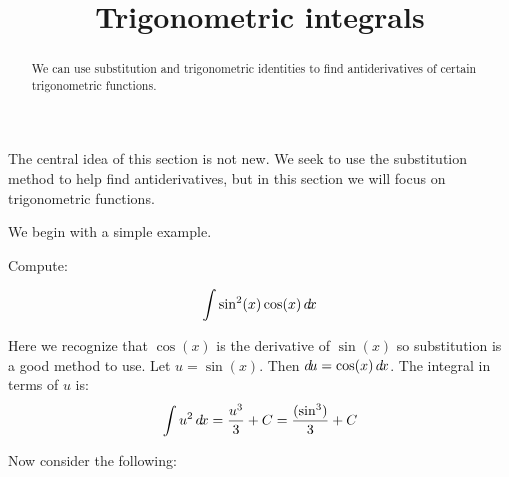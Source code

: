 \documentclass{ximera}
\title[Dig-In:]{Trigonometric integrals}
\begin{document}
\begin{abstract}
  We can use substitution and trigonometric identities to find antiderivatives of certain
  trigonometric functions.
\end{abstract}
\maketitle

The central idea of this section is not new. We seek to use the substitution method to help find antiderivatives, but in this section we will focus on trigonometric functions. 

We begin with a simple example.

\begin{example}
Compute:

\[
\int \sin^{2}(x) \cos(x) \mathop{}\!d\! x
\]

\begin{explanation}
Here we recognize that $\cos(x)$ is the derivative of $\sin(x)$ so substitution is a good method to use. Let $u=\sin(x)$. Then $\mathop{}\!d\! u=\cos(x) \mathop{}\!d\! x$. 
The integral in terms of $u$ is:
\[ 
\int u^{2} \mathop{}\!d\! x=\frac{u^{3}}{3}+C=\frac{ (\sin^{3})}{3}+C
\]
\end{explanation}

\end{example}



Now consider the following:
\end{document}
